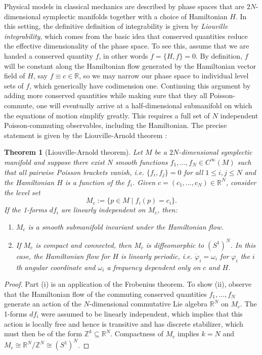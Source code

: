 \documentclass[11pt]{report}
\newtheorem{theorem}{Theorem}[section]
\theoremstyle{definition}
\theoremstyle{remark}
\theoremstyle{remark}
\newcommand{\Z}{\mathbb{Z}}
\newcommand{\R}{\mathbb{R}}
\begin{document}
Physical models in classical mechanics are described by phase spaces that are $2N$-dimensional symplectic manifolds together with a choice of Hamiltonian $H$. In this setting, the definitive definition of integrability is given by \emph{Liouville integrability}, which comes from the basic idea that conserved quantities reduce the effective dimensionality of the phase space. To see this, assume that we are handed a conserved quantity $f$, in other words $\dot f = \{ H, f \} = 0$. By definition, $f$ will be constant along the Hamiltonian flow generated by the Hamiltonian vector field of $H$, say $f \equiv c \in \R$, so we may narrow our phase space to individual level sets of $f$, which generically have codimension one. Continuing this argument by adding more conserved quantities while making sure that they all Poisson-commute, one will eventually arrive at a half-dimensional submanifold on which the equations of motion simplify greatly. This requires a full set of $N$ independent Poisson-commuting observables, including the Hamiltonian. The precise statement is given by the Liouville-Arnold theorem \cite{book:arutyunov:elements,book:arnold}:

\begin{theorem}[Liouville-Arnold theorem]
Let $M$ be a $2N$-dimensional symplectic manifold and suppose there exist $N$ smooth functions $f_1,...,f_N \in C^\infty(M)$ such that all pairwise Poisson brackets vanish, \emph{i.e.} $\{ f_i,f_j \} = 0$ for all $1 \leq i,j \leq N$ and the Hamiltonian $H$ is a function of the $f_i$. Given $c = (c_1,...,c_N) \in \R^N$, consider the level set
\begin{equation*}
M_c := \{ p \in M \mid f_i(p) = c_i \}.
\end{equation*}
If the 1-forms $df_i$ are linearly independent on $M_c$, then:
\begin{enumerate}[label=(\roman*)]
\item $M_c$ is a smooth submanifold invariant under the Hamiltonian flow.
\item If $M_c$ is compact and connected, then $M_c$ is diffeomorphic to $(S^1)^N$. In this case, the Hamiltonian flow for $H$ is linearly periodic, \emph{i.e.} $\dot \varphi_i = \omega_i$ for $\varphi_i$ the $i$th angular coordinate and $\omega_i$ a frequency dependent only on $c$ and $H$.
\end{enumerate}
\end{theorem}

\begin{proof}
Part (i) is an application of the Frobenius theorem. To show (ii), observe that the Hamiltonian flow of the commuting conserved quantities $f_1,...,f_N$ generate an action of the $N$-dimensional commutative Lie algebra $\R^N$ on $M_c$. The 1-forms $df_i$ were assumed to be linearly independent, which implies that this action is locally free and hence is transitive and has discrete stabilizer, which must then be of the form $\Z^k \subseteq \R^N$. Compactness of $M_c$ implies $k=N$ and $M_c \cong \R^N / \Z^N \cong (S^1)^N$.
\end{proof}
\end{document}
